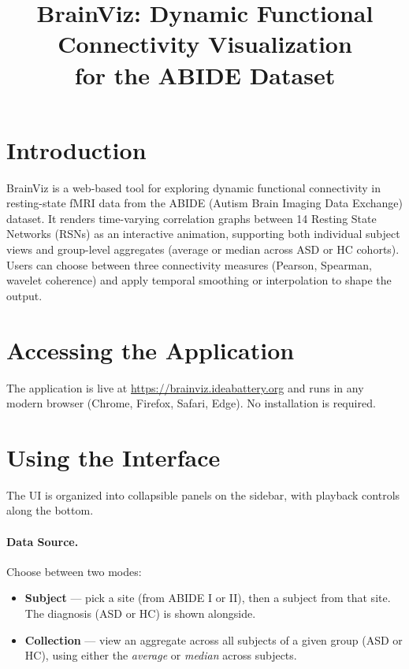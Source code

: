 \documentclass[11pt,a4paper]{article}
\title{BrainViz: Dynamic Functional Connectivity Visualization\\\large for the ABIDE Dataset}
\author{}
\date{}
\begin{document}
\maketitle

\section{Introduction}

BrainViz is a web-based tool for exploring dynamic functional connectivity
in resting-state fMRI data from the ABIDE (Autism Brain Imaging Data
Exchange) dataset. It renders time-varying correlation graphs between
14 Resting State Networks (RSNs) as an interactive animation, supporting
both individual subject views and group-level aggregates (average or
median across ASD or HC cohorts). Users can choose between three
connectivity measures (Pearson, Spearman, wavelet coherence) and apply
temporal smoothing or interpolation to shape the output.

\section{Accessing the Application}

The application is live at \url{https://brainviz.ideabattery.org} and
runs in any modern browser (Chrome, Firefox, Safari, Edge). No
installation is required.

\section{Using the Interface}

The UI is organized into collapsible panels on the sidebar, with
playback controls along the bottom.

\paragraph{Data Source.} Choose between two modes:
\begin{itemize}
    \item \textbf{Subject} --- pick a site (from ABIDE I or II), then a
    subject from that site. The diagnosis (ASD or HC) is shown alongside.
    \item \textbf{Collection} --- view an aggregate across all subjects
    of a given group (ASD or HC), using either the \emph{average} or
    \emph{median} across subjects.
\end{itemize}
\end{document}
